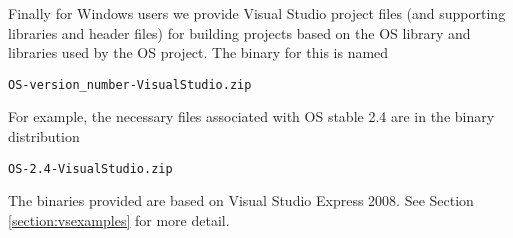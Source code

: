 Finally for Windows users we provide Visual Studio  project files 
(and supporting libraries and header files) for building projects based on the OS library and libraries 
used by the OS project. The binary for this is named
\begin{verbatim}
OS-version_number-VisualStudio.zip
\end{verbatim}
For example, the necessary files associated with  OS  stable 2.4 
are in the binary distribution
\begin{verbatim}
OS-2.4-VisualStudio.zip
\end{verbatim}
The binaries provided are based on Visual Studio Express 2008.  
\ifruncode\else See Section \ref{section:vsexamples} for more detail.\fi
